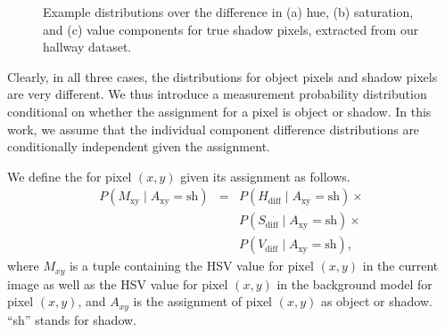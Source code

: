 \begin{figure}[t]
  \caption[Example distributions over the difference in hue,
    saturation, and value components for true shadow pixels, extracted
    from our hallway dataset.]{\small Example distributions over the
    difference in (a) hue, (b) saturation, and (c) value components
    for true shadow pixels, extracted from our hallway dataset.}
  \label{fig:shadow-distribution}
\end{figure}

Clearly, in all three cases, the distributions for object pixels and
shadow pixels are very different.  We thus introduce a measurement
probability distribution conditional on whether the assignment for a
pixel is object or shadow. In this work, we assume that the individual
component difference distributions are conditionally independent given
the assignment.

We define the \DIFdelbegin {}\DIFdelend \DIFaddbegin {}\DIFaddend for pixel $(x, y)$ given its 
assignment as follows.
\begin{equation}
  \label{eq:shadow-measurement}
  \begin{array}{ccl}
    P(M_{\text{xy}} \mid A_{\text{xy}} = \text{sh}) 
            & = & P(H_{\text{diff}} \mid A_{\text{xy}} = \text{sh}) \times \\
            &   & P(S_{\text{diff}} \mid A_{\text{xy}} = \text{sh}) \times \\
            &   & P(V_{\text{diff}} \mid A_{\text{xy}} = \text{sh}),
  \end{array}
\end{equation}
where $M_{xy}$ is a tuple containing the HSV value for pixel $(x,y)$
in the current image as well as the HSV value for pixel $(x,y)$ in the
background model for pixel $(x,y)$, and $A_{xy}$ is the assignment of
pixel $(x,y)$ as object or shadow. ``sh'' stands for shadow.

